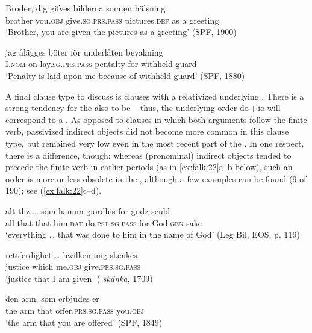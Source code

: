 \documentclass[output=paper]{langscibook}
\begin{document}
\ea%
    \label{ex:falk:21}
\ea \label{ex:falk:21a}
\gll Broder,  dig    gifves            bilderna      som  en  hälsning\\
      brother  you.\textsc{obj}  give.\textsc{sg.prs.pass}  pictures\textsc{.def}  as    a  greeting\\
\glt ‘Brother, you are given the pictures as a greeting’ (SPF, 1900)

\ex \label{ex:falk:21b}
\gll jag      ålägges          böter      för    underlåten  bevakning\\
      I.\textsc{nom}  on-lay.\textsc{sg.prs.pass}  pentalty  for    withheld   guard\\
\glt ‘Penalty is laid upon me because of withheld guard’ (SPF, 1880)
\z
\z

A final clause type to discuss is clauses with a relativized underlying . There is a strong tendency for the  also to be  – thus, the underlying order do\,+\,io will correspond to a . As opposed to clauses in which both arguments follow the finite verb, passivized indirect objects did not become more common in this clause type, but remained very low even in the most recent part of the . In one respect, there is a difference, though: whereas (pronominal) indirect objects tended to precede the finite verb in earlier periods (as in \ref{ex:falk:22}a–b below), such an order is more or less obsolete in the , although a few examples can be found (9 of 190); see (\ref{ex:falk:22}c–d).


\ea%
    \label{ex:falk:22}
\ea\label{ex:falk:22a}
\gll alt  thz …    som  hanum    giordhis          for    gudz      sculd\\
      all  that {}  that  him\textsc{.dat}    do\textsc{.pst.sg.pass}  for    God.\textsc{gen}  sake\\
\glt ‘everything … that was done to him in the name of God’ (Leg Bil, EOS, p. 119)

\ex\label{ex:falk:22b}
\gll rettferdighet … hwilken  mig    skenkes\\
      justice {}      which    me\textsc{.obj}   give\textsc{.prs.sg.pass}\\
\glt ‘justice that I am given’ ( \textit{skänka}, 1709)

\ex\label{ex:falk:22c}
\gll den  arm,  som  erbjudes            er\\
      the  arm  that  offer\textsc{.prs.sg.pass}     you.\textsc{obj}\\
\glt ‘the arm that you are offered’ (SPF, 1849)
\end{document}
